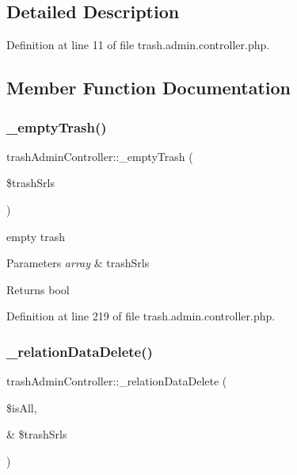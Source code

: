 \subsection{Detailed Description}


Definition at line 11 of file trash.\+admin.\+controller.\+php.



\subsection{Member Function Documentation}
\hypertarget{classtrashAdminController_adaff8ae03021995e529e1c8f6510ff24}{}\label{classtrashAdminController_adaff8ae03021995e529e1c8f6510ff24} 
\subsubsection{\texorpdfstring{\+\_\+empty\+Trash()}{\_emptyTrash()}}
{\footnotesize\ttfamily trash\+Admin\+Controller\+::\+\_\+empty\+Trash (\begin{DoxyParamCaption}\item[{}]{\$trash\+Srls }\end{DoxyParamCaption})}

empty trash 
\begin{DoxyParams}{Parameters}
{\em array} & trash\+Srls \\
\hline
\end{DoxyParams}
\begin{DoxyReturn}{Returns}
bool 
\end{DoxyReturn}


Definition at line 219 of file trash.\+admin.\+controller.\+php.

\hypertarget{classtrashAdminController_a6f402d0113009b914de8665786d95ae9}{}\label{classtrashAdminController_a6f402d0113009b914de8665786d95ae9} 
\subsubsection{\texorpdfstring{\+\_\+relation\+Data\+Delete()}{\_relationDataDelete()}}
{\footnotesize\ttfamily trash\+Admin\+Controller\+::\+\_\+relation\+Data\+Delete (\begin{DoxyParamCaption}\item[{}]{\$is\+All,  }\item[{\&}]{\$trash\+Srls }\end{DoxyParamCaption})}

